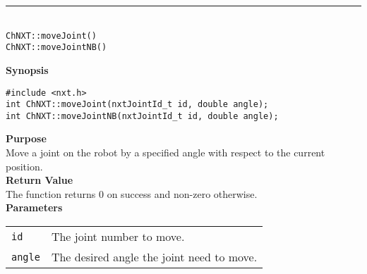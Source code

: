 \noindent
\vspace{5pt}
\rule{4.5in}{0.015in}\\
\noindent
{\LARGE \texttt{ChNXT::moveJoint()} }\\
{\LARGE \texttt{ChNXT::moveJointNB()} }\\


\noindent
{\bf Synopsis}
\begin{lstlisting}
#include <nxt.h>
int ChNXT::moveJoint(nxtJointId_t id, double angle);
int ChNXT::moveJointNB(nxtJointId_t id, double angle);
\end{lstlisting}

\noindent
{\bf Purpose}\\
Move a joint on the robot by a specified angle with respect to the
current position.\\

\noindent
{\bf Return Value}\\
The function returns 0 on success and non-zero otherwise.\\

\noindent
{\bf Parameters}\\
\vspace{-0.1in}
\begin{description}
\item               
\begin{tabular}{p{20 mm}p{135 mm}}
\texttt{id} & The joint number to move. \\
\texttt{angle} & The desired angle the joint need to move. \\
\end{tabular}
\end{description}

